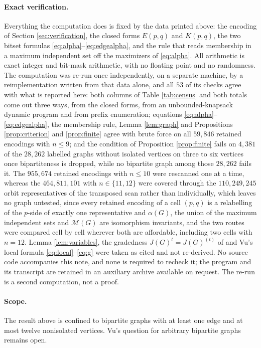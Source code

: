 \documentclass[11pt]{amsart}
\newcommand{\M}{\mathcal M}
\begin{document}
\paragraph{Exact verification.}
Everything the computation does is fixed by the data printed above: the encoding
of Section \ref{sec:verification}, the closed forms $E(p,q)$ and $K(p,q)$, the
two bitset formulas \eqref{eq:alpha}--\eqref{eq:edgealpha}, and the rule that
reads membership in a maximum independent set off the maximizers of
\eqref{eq:alpha}. All arithmetic is exact integer and bit-mask arithmetic, with
no floating point and no randomness. The computation was re-run once
independently, on a separate machine, by a reimplementation written from that
data alone, and all $53$ of its checks agree with what is reported here: both
columns of Table \ref{tab:census} and both totals come out three ways, from the
closed forms, from an unbounded-knapsack dynamic program and from prefix
enumeration; equations \eqref{eq:alpha}--\eqref{eq:edgealpha}, the membership
rule, Lemma \ref{lem:graph} and Propositions \ref{prop:criterion} and
\ref{prop:finite} agree with brute force on all $59{,}846$ retained encodings
with $n\leq9$; and the condition of Proposition \ref{prop:finite} fails on
$4{,}381$ of the $28{,}262$ labelled graphs without isolated vertices on three
to six vertices once bipartiteness is dropped, while no bipartite graph among
those $28{,}262$ fails it. The
$955{,}674$ retained encodings with $n\leq10$ were rescanned one at a time,
whereas the $464{,}811{,}101$ with $n\in\{11,12\}$ were covered through the
$110{,}249{,}245$ orbit representatives of the transposed scan rather than
individually, which leaves no graph untested, since every retained encoding of a
cell $(p,q)$ is a relabelling of the $p$-side of exactly one representative and
$\alpha(G)$, the union of the maximum independent sets and $\M(G)$ are
isomorphism invariants, and the two routes were compared cell by cell wherever
both are affordable, including two cells with $n=12$. Lemma
\ref{lem:variables}, the gradedness $J(G)^t=J(G)^{(t)}$ of \cite{HHT} and Vu's
local formula \eqref{eq:local}--\eqref{eq:g} were taken as cited and not
re-derived. No source code accompanies this note, and none is required to
recheck it; the program and its transcript are retained in an auxiliary archive
available on request. The re-run is a second computation, not a proof.

\paragraph{Scope.}
The result above is confined to bipartite graphs with at least one edge and at
most twelve nonisolated vertices. Vu's question for arbitrary bipartite graphs
remains open.
\end{document}
